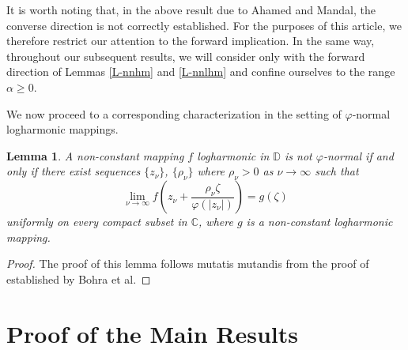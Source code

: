 \documentclass[10pt,a4paper]{amsart}
\newtheorem{lemma}[theorem]{Lemma}
\numberwithin{equation}{section}
\begin{document}
It is worth noting that, in the above result due to Ahamed and Mandal, the converse direction is not 
correctly established. For the purposes of this article, we therefore restrict our attention to the 
forward implication. In the same way, throughout our subsequent results, we will consider only with the forward direction of Lemmas \ref{L-nnhm} and 
\ref{L-nnlhm} and confine ourselves to the range $\alpha\geq 0$.\smallskip

We now proceed to a corresponding characterization in the setting of $\varphi$-normal logharmonic mappings.
\begin{lemma} \label{L-phinnlhm} 
A non-constant mapping $f$ logharmonic in $\mathbb D$ is not $\varphi$-normal if and only if there exist
sequences $\{z_{\nu}\}$, $\{\rho_{\nu} \}$ where $\rho_{\nu} >0 $ as $\nu\to\infty$ such that 
\begin{equation*}\lim_{\nu\to\infty} f\left(z_{\nu}+\frac{\rho_{\nu} \zeta}{\varphi(|z_{\nu}|)}\right)=g(\zeta)\end{equation*}
uniformly on every compact subset in $\mathbb C$, where $g$ is a non-constant logharmonic mapping.
\end{lemma}
\begin{proof} The proof of this lemma follows mutatis mutandis from the proof of \cite[Theorem 1.3]{bohra-lfptfpnhm-2025} established by Bohra et al.\end{proof}
\section{Proof of the Main Results}
\end{document}
